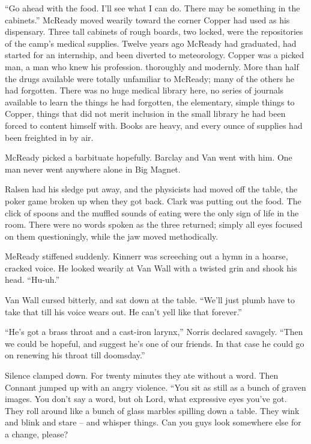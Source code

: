 \documentclass[ebook,oneside,11pt]{memoir}				%
\begin{document}
``Go ahead with the food. I'll see what I can do. There may be something in the cabinets.'' McReady moved wearily toward the corner Copper had used as his dispensary. Three tall cabinets of rough boards, two locked, were the repositories of the camp's medical supplies. Twelve years ago McReady had graduated, had started for an internship, and been diverted to meteorology. Copper was a picked man, a man who knew his profession. thoroughly and modernly. More than half the drugs available were totally unfamiliar to McReady; many of the others he had forgotten. There was no huge medical library here, no series of journals available to learn the things he had forgotten, the elementary, simple things to Copper, things that did not merit inclusion in the small library he had been forced to content himself with. Books are heavy, and every ounce of supplies had been freighted in by air.

McReady picked a barbituate hopefully. Barclay and Van went with him. One man never went anywhere alone in Big Magnet.

Ralsen had his sledge put away, and the physicists had moved off the table, the poker game broken up when they got back. Clark was putting out the food. The click of spoons and the muffled sounds of eating were the only sign of life in the room. There were no words spoken as the three returned; simply all eyes focused on them questioningly, while the jaw moved methodically.

MeReady stiffened suddenly. Kinnerr was screeching out a hymn in a hoarse, cracked voice. He looked wearily at Van Wall with a twisted grin and shook his head. ``Hu-uh.''

Van Wall cursed bitterly, and sat down at the table. ``We'll just plumb have to take that till his voice wears out. He can't yell like that forever.''

``He's got a brass throat and a cast-iron larynx,'' Norris declared savagely. ``Then we could be hopeful, and suggest he's one of our friends. In that case he could go on renewing his throat till doomsday.''

Silence clamped down. For twenty minutes they ate without a word. Then Connant jumped up with an angry violence. ``You sit as still as a bunch of graven images. You don't say a word, but oh Lord, what expressive eyes you've got. They roll around like a bunch of glass marbles spilling down a table. They wink and blink and stare -- and whisper things. Can you guys look somewhere else for a change, please?
\end{document}
